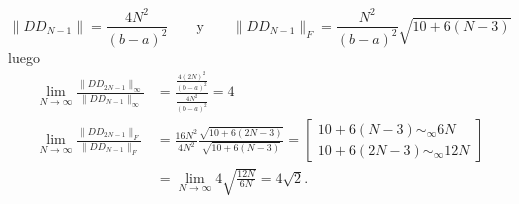 \documentclass[12pt]{article}
\newcommand{\norm}[1]{\lVert #1\rVert}
\theoremstyle{definition}
\begin{document}
$$\norm{DD_{N-1}} = \frac{4 N^2}{(b - a)^2}\quad \quad \text{y} \quad \quad \norm{DD_{N-1}}_F = \frac{N^2}{(b-a)^2}\sqrt{10 + 6(N - 3)}$$
luego
\begin{align*}
	\lim_{N\to\infty}\frac{\norm{DD_{2N-1}}_\infty}{\norm{DD_{N-1}}_\infty} &= \frac{\frac{4 (2 N)^2}{(b-a)^2}}{\frac{4 N^2}{(b-a)^2}} = 4 \\
	\lim_{N\to\infty}\frac{\norm{DD_{2N-1}}_F}{\norm{DD_{N-1}}_F} &= \frac{16 N^2}{4N^2}\frac{\sqrt{10 + 6(2N - 3)}}{\sqrt{10 + 6(N - 3)}} = \left[\begin{matrix}
		10 + 6(N - 3) \sim_\infty 6N \\
		10 + 6(2N - 3) \sim_\infty 12N
	\end{matrix}\right]  \\
	&= \lim_{N\to\infty} 4 \sqrt{\frac{12 N }{6 N}} = 4 \sqrt{2}.
\end{align*}
\end{document}
